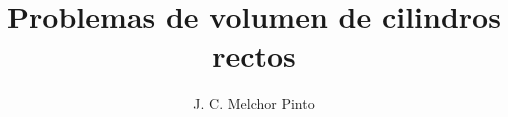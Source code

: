 \documentclass[12pt]{guia}
\title{Problemas de volumen de cilindros rectos}
\author{J. C. Melchor Pinto}
\begin{document}
\pagestyle{headandfoot}
\addpoints
\INFO
\printanswers
\begin{questions}
    
    
    
    
    
    
    
    
    
\end{questions}

\end{document}
